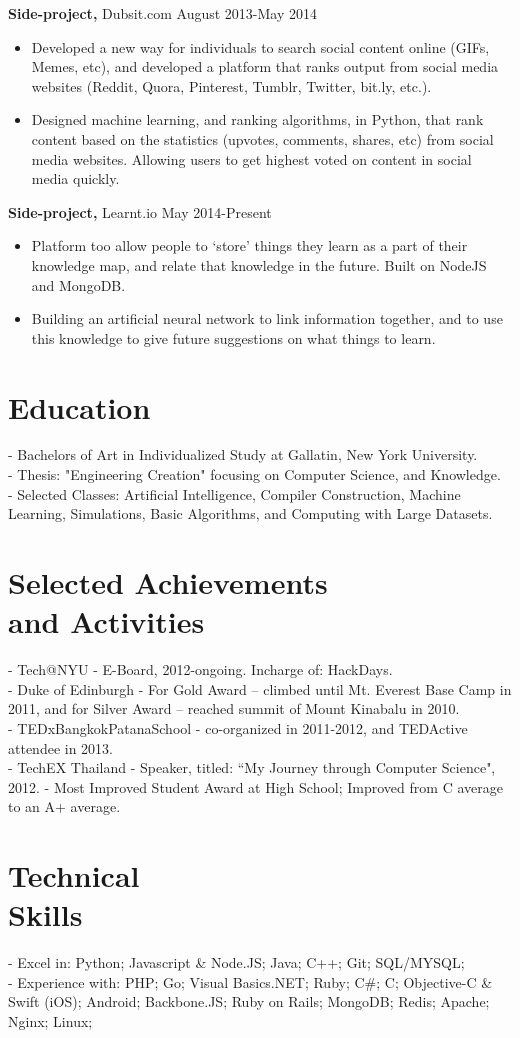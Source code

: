 \documentclass[margin]{res}
\begin{document}
\begin{resume}
 {\bf Side-project,} Dubsit.com \hfill August 2013-May 2014
 \begin{itemize} \itemsep -2pt 
 \item Developed a new way for individuals to search social content online (GIFs, Memes, etc), and developed a platform that ranks output from social media websites (Reddit, Quora, Pinterest, Tumblr, Twitter, bit.ly, etc.).
 \item Designed machine learning, and ranking algorithms, in Python, that rank content based on the statistics (upvotes, comments, shares, etc) from social media websites. Allowing users to get highest voted on content in social media quickly.
 \end{itemize}
 
{\bf Side-project,} Learnt.io \hfill May 2014-Present
\begin{itemize} \itemsep -2pt 
\item Platform too allow people to `store' things they learn as a part of their knowledge map, and relate that knowledge in the future. Built on NodeJS and MongoDB.
\item Building an artificial neural network to link information together, and to use this knowledge to give future suggestions on what things to learn.
\end{itemize}

\section{Education} 
- Bachelors of Art in Individualized Study at Gallatin, New York University. \\
- Thesis: "Engineering Creation" focusing on Computer Science, and Knowledge. \\
- Selected Classes: Artificial Intelligence, Compiler Construction, Machine Learning, Simulations, Basic Algorithms, and Computing with Large Datasets.

\section{Selected Achievements \\ and Activities} 
- Tech@NYU - E-Board, 2012-ongoing. Incharge of: HackDays. \\
- Duke of Edinburgh - For Gold Award -- climbed until Mt. Everest Base Camp in 2011, and for Silver Award -- reached summit of Mount Kinabalu in 2010. \\
- TEDxBangkokPatanaSchool - co-organized in 2011-2012, and TEDActive attendee in 2013. \\
- TechEX Thailand - Speaker, titled: ``My Journey through Computer Science", 2012.
- Most Improved Student Award at High School; Improved from C average to an A+ average.

\section{Technical \\ Skills}
- Excel in: Python; Javascript \& Node.JS; Java;  C++; Git; SQL/MYSQL; \\
- Experience with: PHP; Go; Visual Basics.NET; Ruby; C\#; C; Objective-C \& Swift (iOS); Android; Backbone.JS; Ruby on Rails; MongoDB; Redis; Apache; Nginx; Linux;

\end{resume} 
\end{document}
